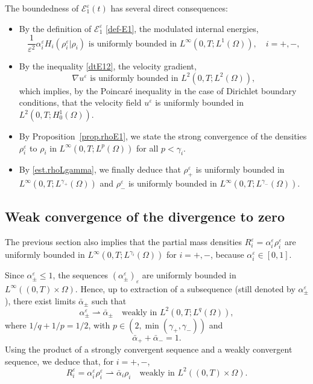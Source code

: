\documentclass[11pt, twoside, a4paper]{article}
\theoremstyle{plain}
\theoremstyle{remark}
\numberwithin{equation}{section}
\def\EE{{\mathcal E}}
\renewcommand{\leq}{\leqslant}\renewcommand{\le}{\leqslant}
\newcommand{\eps}{\varepsilon}
\begin{document}
The boundedness of $\EE_1^\eps(t)$ has several direct consequences:
\begin{itemize}
\item By the definition of $\EE_1^\eps$ \eqref{def-E1}, the modulated internal energies,
 \begin{equation*}
 \frac{1}{\varepsilon^2} \alpha_i^\varepsilon H_i(\rho_i^\eps|\rho_i) \text{ is uniformly bounded in } L^\infty(0,T; L^1(\Omega)), \quad i=+,-,
 \end{equation*}
 \item By the inequality \eqref{dtE12}, the velocity gradient,
 \begin{equation*}
 \nabla u^\varepsilon \text{ is uniformly bounded in } L^2(0,T; L^2(\Omega)),
 \end{equation*}
which implies, by the Poincaré inequality in the case of Dirichlet boundary conditions, that the velocity field \(u^\varepsilon\) is uniformly bounded in \(L^2(0,T; H_0^1(\Omega))\).
\item By Proposition~\ref{prop.rhoE1}, we state the strong convergence of the densities $\rho_i^\eps$ to $\rho_i$ in $L^\infty(0,T;L^p(\Omega))$ for all $p<\gamma_i$.
\item By \eqref{est.rhoLgamma}, we finally deduce that $\rho_+^\varepsilon$ is uniformly bounded in $L^\infty(0,T;L^{\gamma_+}(\Omega))$ and $\rho_-^\varepsilon$ is uniformly bounded in $L^\infty(0,T;L^{\gamma_-}(\Omega))$.
\end{itemize}




\subsection{Weak convergence of the divergence to zero}


The previous section also implies that the partial mass densities $R_i^\varepsilon = \alpha_i^\varepsilon \rho_i^\varepsilon$ are uniformly bounded in \(L^\infty(0,T; L^{\gamma_i}(\Omega))\) for \(i=+,-\), because $\alpha_i^\eps\in [0,1]$.

Since $\alpha_\pm^\varepsilon \leq 1$, the sequences $(\alpha_\pm^\varepsilon)_\varepsilon$ are uniformly bounded in $L^\infty((0,T)\times\Omega)$. 
Hence, up to extraction of a subsequence (still denoted by $\alpha_\pm^\varepsilon$), there exist limits $\bar{\alpha}_\pm$ such that
\[
\alpha_\pm^\varepsilon \rightharpoonup \bar{\alpha}_\pm \quad \text{weakly in } L^2(0,T;L^q(\Omega)),
\]
where $1/q+1/p=1/2$, with $p\in (2,\min(\gamma_+,\gamma_-))$ and 
\[
\bar{\alpha}_+ + \bar{\alpha}_- = 1.
\]
Using the product of a strongly convergent sequence and a weakly convergent sequence, we deduce that, for $i=+,-$,
\[
R_i^\varepsilon = \alpha_i^\varepsilon \rho_i^\varepsilon \rightharpoonup \bar{\alpha}_i \rho_i 
\quad \text{weakly in } L^2((0,T)\times \Omega).
\]
\end{document}
